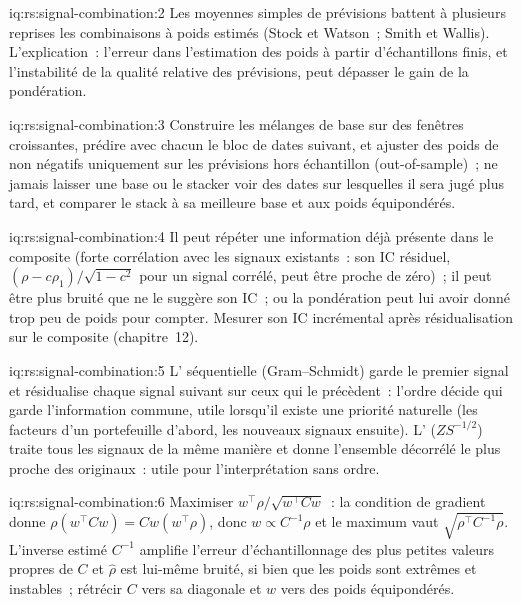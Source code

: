 \begin{solution}{iq:rs:signal-combination:2}
Les moyennes simples de prévisions battent à plusieurs reprises les combinaisons à poids estimés (Stock et Watson~; Smith et Wallis). L'explication~: l'erreur dans
l'estimation des poids à partir d'échantillons finis, et l'instabilité de la qualité relative des prévisions, peut dépasser le gain de la pondération.
\end{solution}

\begin{solution}{iq:rs:signal-combination:3}
Construire les mélanges de base sur des fenêtres croissantes, prédire avec chacun le bloc de dates suivant, et ajuster des poids de  non négatifs
uniquement sur les prévisions hors échantillon (out-of-sample)~; ne jamais laisser une base ou le stacker voir des dates sur lesquelles il sera jugé plus tard, et comparer le stack à sa meilleure base et aux poids équipondérés.
\end{solution}

\begin{solution}{iq:rs:signal-combination:4}
Il peut répéter une information déjà présente dans le composite (forte corrélation avec les signaux existants~: son IC résiduel, $(\rho - c\rho_1)/\sqrt{1 - c^2}$ pour un
signal corrélé, peut être proche de zéro)~; il peut être plus bruité que ne le suggère son IC~; ou la pondération peut lui avoir donné trop peu de poids pour compter. Mesurer son
IC incrémental après résidualisation sur le composite (chapitre~12).
\end{solution}

\begin{solution}{iq:rs:signal-combination:5}
L' séquentielle (Gram--Schmidt) garde le premier signal et résidualise chaque signal suivant sur ceux qui le précèdent~: l'ordre décide qui garde
l'information commune, utile lorsqu'il existe une priorité naturelle (les facteurs d'un portefeuille d'abord, les nouveaux signaux ensuite). L' ($ZS^{-1/2}$) traite tous les
signaux de la même manière et donne l'ensemble décorrélé le plus proche des originaux~: utile pour l'interprétation sans ordre.
\end{solution}

\begin{solution}{iq:rs:signal-combination:6}
Maximiser $w^\top\rho/\sqrt{w^\top Cw}$~: la condition de gradient donne $\rho(w^\top Cw) = Cw(w^\top\rho)$, donc $w \propto C^{-1}\rho$ et le maximum vaut
$\sqrt{\rho^\top C^{-1}\rho}$. L'inverse estimé $C^{-1}$ amplifie l'erreur d'échantillonnage des plus petites valeurs propres de $C$ et $\hat\rho$ est lui-même bruité, si bien que les
poids sont extrêmes et instables~; rétrécir $C$ vers sa diagonale et $w$ vers des poids équipondérés.
\end{solution}
